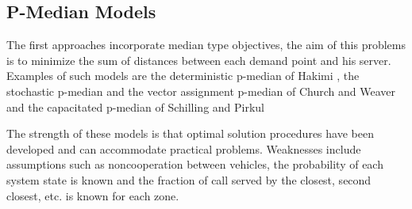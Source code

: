 \subsection{P-Median Models}
The first approaches
incorporate median type objectives,
the aim of this problems is
to minimize the sum of distances
between
each demand point and his server.
Examples of such models are
the deterministic p-median of Hakimi \cite{hakimi1964optimum},
the stochastic p-median and the vector assignment p-median of Church and Weaver
\cite{weaver1983computational,weaver1985median}
and the capacitated p-median of Schilling and Pirkul \cite{pirkul1988siting}

The strength of these models
is that optimal solution procedures
have been developed
and can accommodate practical problems.
Weaknesses include assumptions
such as noncooperation between vehicles,
the probability of each system state is known
and the fraction of call
served by the closest, second closest, etc.
is known for each zone.
